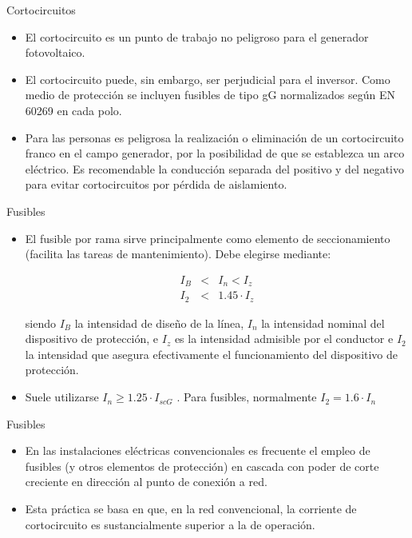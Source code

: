 \documentclass[xcolor={usenames,svgnames,dvipsnames}]{beamer}
\begin{document}
\begin{frame}[label=sec-5-1-5]{Cortocircuitos}
\begin{itemize}
\item El \alert{cortocircuito} es un punto de trabajo \alert{no peligroso para el
generador fotovoltaico}.

\item El cortocircuito puede, sin embargo, ser \alert{perjudicial para el
inversor}. Como medio de protección se incluyen fusibles de tipo gG
normalizados según EN 60269 en cada polo.

\item Para las personas es \alert{peligrosa la realización o eliminación de un
cortocircuito franco en el campo generador}, por la posibilidad de
que se establezca un arco eléctrico. Es recomendable la \alert{conducción
separada} del positivo y del negativo para evitar cortocircuitos por
pérdida de aislamiento.
\end{itemize}
\end{frame}

\begin{frame}[label=sec-5-1-6]{Fusibles}
\begin{itemize}
\item El \alert{fusible por rama} sirve principalmente como \alert{elemento de
seccionamiento} (facilita las tareas de mantenimiento). Debe elegirse
mediante:

$$\begin{aligned}
   I_{B} & < & I_{n}<I_{z}\\
   I_{2} & < & 1.45\cdot I_{z}\end{aligned}$$

siendo $I_{B}$ la intensidad de diseño de la línea, $I_{n}$ la
intensidad nominal del dispositivo de protección, e $I_{z}$ es la
intensidad admisible por el conductor e $I_{2}$ la intensidad que
asegura efectivamente el funcionamiento del dispositivo de
protección.

\item Suele utilizarse $I_{n}\geq1.25\cdot I_{scG}$ . Para fusibles,
normalmente $I_{2}=1.6\cdot I_{n}$
\end{itemize}
\end{frame}

\begin{frame}[label=sec-5-1-7]{Fusibles}
\begin{itemize}
\item En las instalaciones eléctricas convencionales es frecuente el empleo
de fusibles (y otros elementos de protección) en cascada con poder de
corte creciente en dirección al punto de conexión a red.

\item Esta práctica se basa en que, en la red convencional, la corriente de
cortocircuito es sustancialmente superior a la de operación.
\end{itemize}
\end{frame}
\end{document}
